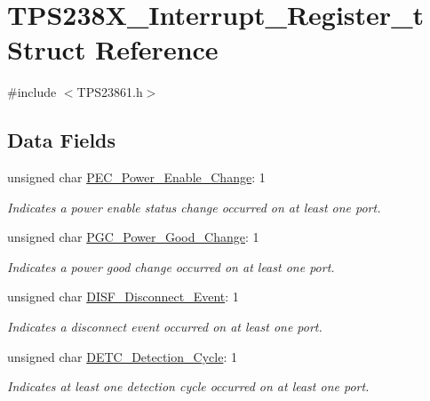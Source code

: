 \hypertarget{struct_t_p_s238_x___interrupt___register__t}{\section{T\-P\-S238\-X\-\_\-\-Interrupt\-\_\-\-Register\-\_\-t Struct Reference}
\label{struct_t_p_s238_x___interrupt___register__t}
}


{\ttfamily \#include $<$T\-P\-S23861.\-h$>$}

\subsection*{Data Fields}
\begin{DoxyCompactItemize}
\item 
unsigned char \hyperlink{struct_t_p_s238_x___interrupt___register__t_a6e4b4f46b19373a34ad76db49cffc6ac}{P\-E\-C\-\_\-\-Power\-\_\-\-Enable\-\_\-\-Change}\-: 1
\begin{DoxyCompactList}\small\item\em Indicates a power enable status change occurred on at least one port. \end{DoxyCompactList}\item 
unsigned char \hyperlink{struct_t_p_s238_x___interrupt___register__t_ad83f0d6ea0a21a760e7953480db37a1b}{P\-G\-C\-\_\-\-Power\-\_\-\-Good\-\_\-\-Change}\-: 1
\begin{DoxyCompactList}\small\item\em Indicates a power good change occurred on at least one port. \end{DoxyCompactList}\item 
unsigned char \hyperlink{struct_t_p_s238_x___interrupt___register__t_a2abebe5c5f281ae29eee15814cfd236e}{D\-I\-S\-F\-\_\-\-Disconnect\-\_\-\-Event}\-: 1
\begin{DoxyCompactList}\small\item\em Indicates a disconnect event occurred on at least one port. \end{DoxyCompactList}\item 
unsigned char \hyperlink{struct_t_p_s238_x___interrupt___register__t_accb9d25faba48fe00a0a4d9b5d4e544b}{D\-E\-T\-C\-\_\-\-Detection\-\_\-\-Cycle}\-: 1
\begin{DoxyCompactList}\small\item\em Indicates at least one detection cycle occurred on at least one port. \end{DoxyCompactList}\item 

\end{DoxyCompactItemize}
